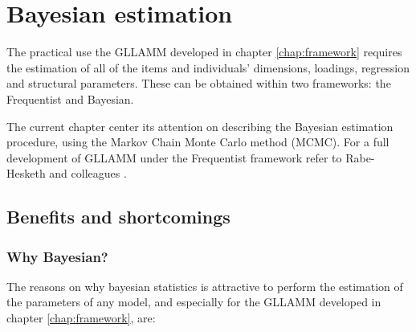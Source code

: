 \chapter{Bayesian estimation } \label{chap:estimation}

The practical use the GLLAMM developed in chapter \ref{chap:framework} requires the estimation of all of the items and individuals' dimensions, loadings, regression and structural parameters. These can be obtained within two frameworks: the Frequentist and Bayesian. 

The current chapter center its attention on describing the Bayesian estimation procedure, using the Markov Chain Monte Carlo method (MCMC). For a full development of GLLAMM under the Frequentist framework refer to Rabe-Hesketh and colleagues \cite{Rabe_et_al_2004a, Rabe_et_al_2004b, Skrondal_et_al_2004a, Rabe_et_al_2012}.


\section{Benefits and shortcomings}

\subsection{Why Bayesian?}

The reasons on why bayesian statistics is attractive to perform the estimation of the parameters of any model, and especially for the GLLAMM developed in chapter \ref{chap:framework}, are:

